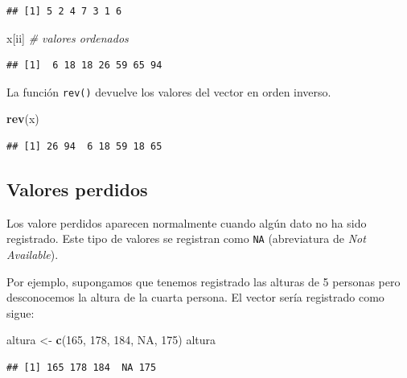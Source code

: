 \documentclass[]{book}
\newenvironment{Shaded}{\begin{snugshade}}{\end{snugshade}}
\newcommand{\KeywordTok}[1]{\textcolor[rgb]{0.13,0.29,0.53}{\textbf{#1}}}
\newcommand{\DecValTok}[1]{\textcolor[rgb]{0.00,0.00,0.81}{#1}}
\newcommand{\StringTok}[1]{\textcolor[rgb]{0.31,0.60,0.02}{#1}}
\newcommand{\CommentTok}[1]{\textcolor[rgb]{0.56,0.35,0.01}{\textit{#1}}}
\newcommand{\OtherTok}[1]{\textcolor[rgb]{0.56,0.35,0.01}{#1}}
\newcommand{\NormalTok}[1]{#1}
\begin{document}
\begin{verbatim}
## [1] 5 2 4 7 3 1 6
\end{verbatim}

\begin{Shaded}
\begin{Highlighting}[]
\NormalTok{x[ii]  }\CommentTok{# valores ordenados}
\end{Highlighting}
\end{Shaded}

\begin{verbatim}
## [1]  6 18 18 26 59 65 94
\end{verbatim}

La función \texttt{rev()} devuelve los valores del vector en orden
inverso.

\begin{Shaded}
\begin{Highlighting}[]
\KeywordTok{rev}\NormalTok{(x)}
\end{Highlighting}
\end{Shaded}

\begin{verbatim}
## [1] 26 94  6 18 59 18 65
\end{verbatim}

\subsection{Valores perdidos}\label{valores-perdidos}

Los valore perdidos aparecen normalmente cuando algún dato no ha sido
registrado. Este tipo de valores se registran como \texttt{NA}
(abreviatura de \emph{Not Available}).

Por ejemplo, supongamos que tenemos registrado las alturas de 5 personas
pero desconocemos la altura de la cuarta persona. El vector sería
registrado como sigue:

\begin{Shaded}
\begin{Highlighting}[]
\NormalTok{altura <-}\StringTok{ }\KeywordTok{c}\NormalTok{(}\DecValTok{165}\NormalTok{, }\DecValTok{178}\NormalTok{, }\DecValTok{184}\NormalTok{, }\OtherTok{NA}\NormalTok{, }\DecValTok{175}\NormalTok{)}
\NormalTok{altura}
\end{Highlighting}
\end{Shaded}

\begin{verbatim}
## [1] 165 178 184  NA 175
\end{verbatim}
\end{document}
